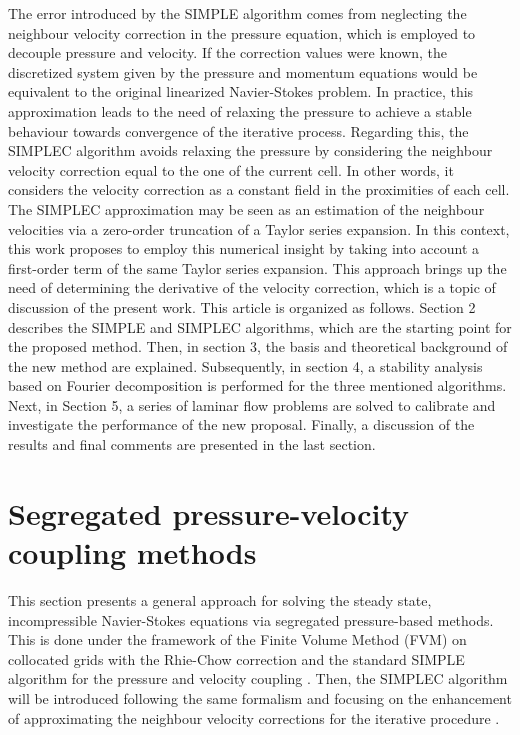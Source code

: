 \documentclass[final,3p,times,11pt,onecolumn]{myElsarticle}
\numberwithin{equation}{section}
\begin{document}
The error introduced by the SIMPLE algorithm comes from neglecting the neighbour velocity correction in the pressure equation, which is employed to decouple pressure and velocity. If the correction values were known, the discretized system given by the pressure and momentum equations would be equivalent to the original linearized Navier-Stokes problem. In practice, this approximation leads to the need of relaxing the pressure to achieve a stable behaviour towards convergence of the iterative process. Regarding this, the SIMPLEC algorithm avoids relaxing the pressure by considering the neighbour velocity correction equal to the one of the current cell. In other words, it considers the velocity correction as a constant field in the proximities of each cell. The SIMPLEC approximation may be seen as an estimation of the neighbour velocities via a zero-order truncation of a Taylor series expansion. In this context, this work proposes to employ this numerical insight by taking into account a first-order term of the same Taylor series expansion. This approach brings up the need of determining the derivative of the velocity correction, which is a topic of discussion of the present work. This article is organized as follows. Section 2 describes the SIMPLE and SIMPLEC algorithms, which are the starting point for the proposed method. Then, in section 3, the basis and theoretical background of the new method are explained. Subsequently, in section 4, a stability analysis based on Fourier decomposition is performed for the three mentioned algorithms. Next, in Section 5, a series of laminar flow problems are solved to calibrate and investigate the performance of the new proposal. Finally, a discussion of the results and final comments are presented in the last section.

\section{Segregated pressure-velocity coupling methods} \label{sec:theory}

This section presents a general approach for solving the steady state, incompressible Navier-Stokes equations via segregated pressure-based methods. This is done under the framework of the Finite Volume Method (FVM) on collocated grids with the Rhie-Chow correction \cite{rhiechow} and the standard SIMPLE algorithm for the pressure and velocity coupling \cite{patankar1972}. Then, the SIMPLEC algorithm will be introduced \cite{vanDoormal} following the same formalism and focusing on the enhancement of approximating the neighbour velocity corrections for the iterative procedure \cite{moukalled}.
\end{document}
